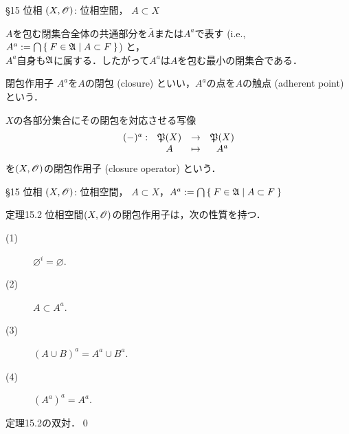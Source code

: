 \documentclass[uplatex,a4paper,dvipdfmx,aspectratio=169,11pt]{beamer}
\begin{document}
\begin{frame}[fragile]{\S 15 位相}
    $(X, \mathscr{O})$: 位相空間， \quad $A \subset X$

    \medskip{}

    $A$を包む閉集合全体の共通部分を$\bar A$または$A^a$で表す (i.e., $A^a := \bigcap \Set{F \in \mathfrak{A}{} | A \subset F}$) と，\\
    $A^a$自身も$\mathfrak{A}$に属する．したがって$A^a$は$A$を包む最小の閉集合である．

    \begin{block}{閉包作用子}
        $A^a$を$A$の\alert{閉包} (closure) といい，$A^a$の点を$A$の\alert{触点} (adherent point) という．

        $X$の各部分集合にその閉包を対応させる写像
        \begin{equation*} 
            \begin{array}{rccc}
                (-)^a: & \mathord{\mathfrak{P}}\qty(X) & \to & \mathord{\mathfrak{P}}\qty(X) \\
                       & A & \mapsto & A^a
            \end{array}
        \end{equation*}
        を$(X, \mathscr{O})$の\alert{閉包作用子} (closure operator) という．
    \end{block}

    \medskip{}


\end{frame}

\begin{frame}[fragile]{\S 15 位相}
    $(X, \mathscr{O})$: 位相空間， \quad $A \subset X$，\quad $A^a := \bigcap \Set{F \in \mathfrak{A}{} | A \subset F}$

    \medskip{}

    \begin{block}{定理15.2}
        位相空間$(X, \mathscr{O})$の閉包作用子は，次の性質を持つ．
        \begin{description}
            \item[(1)] $\varnothing^i = \varnothing$.
            \item[(2)] $A \subset A^a$.
            \item[(3)] $(A \cup B)^a = A^a \cup B^a$.
            \item[(4)] $(A^a)^a = A^a$.
        \end{description}
    \end{block}

    \medskip{}

     \quad 定理15.2の双対．\qed

\end{frame}
\end{document}
